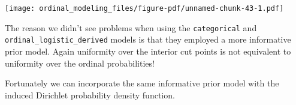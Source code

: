 \documentclass[
  letterpaper,
  DIV=11,
  numbers=noendperiod]{scrartcl}
\newenvironment{Shaded}{\begin{snugshade}}{\end{snugshade}}
\newcommand{\AttributeTok}[1]{\textcolor[rgb]{0.40,0.45,0.13}{#1}}
\newcommand{\ControlFlowTok}[1]{\textcolor[rgb]{0.00,0.23,0.31}{#1}}
\newcommand{\DecValTok}[1]{\textcolor[rgb]{0.68,0.00,0.00}{#1}}
\newcommand{\FloatTok}[1]{\textcolor[rgb]{0.68,0.00,0.00}{#1}}
\newcommand{\FunctionTok}[1]{\textcolor[rgb]{0.28,0.35,0.67}{#1}}
\newcommand{\NormalTok}[1]{\textcolor[rgb]{0.00,0.23,0.31}{#1}}
\newcommand{\OtherTok}[1]{\textcolor[rgb]{0.00,0.23,0.31}{#1}}
\newcommand{\SpecialCharTok}[1]{\textcolor[rgb]{0.37,0.37,0.37}{#1}}
\newcommand{\StringTok}[1]{\textcolor[rgb]{0.13,0.47,0.30}{#1}}
\begin{document}
\begin{Shaded}
\end{Shaded}

\texttt{[image: ordinal\_modeling\_files/figure-pdf/unnamed-chunk-43-1.pdf]}

The reason we didn't see problems when using the \texttt{categorical}
and \texttt{ordinal\_logistic\_derived} models is that they employed a
more informative prior model. Again uniformity over the interior cut
points is not equivalent to uniformity over the ordinal probabilities!

Fortunately we can incorporate the same informative prior model with the
induced Dirichlet probability density function.
\end{document}
